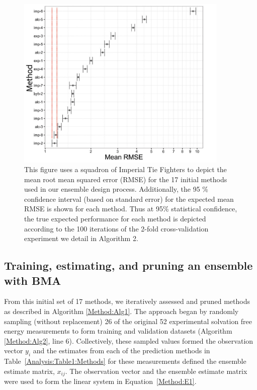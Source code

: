 \documentclass[journal=jpcbfk, manuscript=article]{achemso}
\newcommand{\+}[1]{\ensuremath{\mathbf{#1}}}
\newcommand{\rev}[1]{#1}
\begin{document}
\begin{figure}[h!]
	\centering
	\includegraphics[keepaspectratio,width=0.9\textwidth]{Figures/Rev2/RMSE_SE}
	\caption{
	This figure uses a squadron of Imperial Tie Fighters \cite{Lucas:77} to depict the mean root mean squared error \rev{(RMSE)} for the 17 initial methods used in our ensemble design process.
	\rev{Additionally, the 95 \% confidence interval (based on standard error) for the expected mean RMSE is shown for each method.
	Thus at 95\% statistical confidence, the true expected performance for each method is depicted according to the 100 iterations of the 2-fold cross-validation experiment we detail in Algorithm 2.}}
	\label{Analysis:Figure1:Methods}
\end{figure}
 
 \subsection{\rev{Training, estimating, and pruning an ensemble with BMA}} \label{EP:training}
From this initial set of 17 methods, we iteratively assessed and pruned methods as described in Algorithm \ref{Method:Alg1}.
The approach began by randomly sampling (without replacement) 26 of the original 52 experimental solvation free energy measurements to form training and validation datasets (Algorithm \ref{Method:Alg2}, line 6).
Collectively, these sampled values formed the observation vector $y_i$ and the estimates from each of the prediction methods in Table~\ref{Analysis:Table1:Methods} for these measurements defined the ensemble estimate matrix, $x_{i j}$.
The observation vector and the ensemble estimate matrix were used to form the linear system in Equation~\ref{Method:E1}.  
\end{document}
